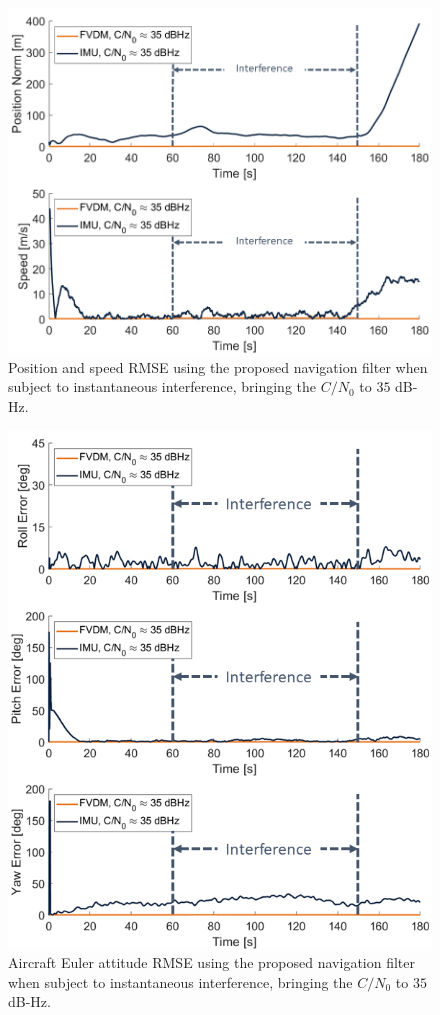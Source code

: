 \documentclass[12pt]{report}
\begin{document}
\begin{figure}[!ht]
  \centering
  \includegraphics[width=0.75\linewidth]{Figures/Results/trajectoryfigure/Slide18.PNG}
  \caption{Position and speed RMSE using the proposed navigation filter when subject to instantaneous interference, bringing the \(C/N_0\) to \(35\) dB-Hz.}\label{fig:PosVel35}
\end{figure}


\begin{figure}[!ht]
  \centering
  \includegraphics[width=0.75\linewidth]{Figures/Results/trajectoryfigure/Slide6.PNG}
  \caption{Aircraft Euler attitude RMSE using the proposed navigation filter when subject to instantaneous interference, bringing the \(C/N_0\) to \(35\) dB-Hz.}\label{fig:Eul35}
\end{figure}
\end{document}
